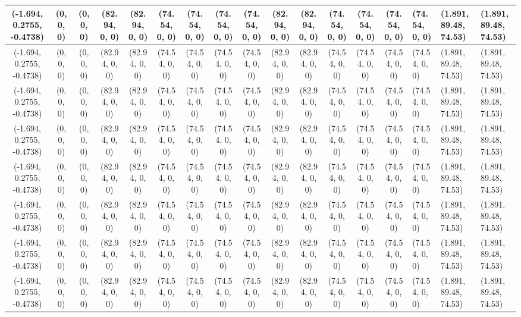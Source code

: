 \begin{tabular}{| c | c | c | c | c | c | c | c | c | c | c | c | c | c |}
	(-1.694, 0.2755, -0.4738) & (0, 0, 0) & (0, 0, 0) & (82.94, 0, 0) & (82.94, 0, 0) & (74.54, 0, 0) & (74.54, 0, 0) & (74.54, 0, 0) & (74.54, 0, 0) & (82.94, 0, 0) & (82.94, 0, 0) & (74.54, 0, 0) & (74.54, 0, 0) & (74.54, 0, 0) & (74.54, 0, 0) & (1.891, 89.48, 74.53) & (1.891, 89.48, 74.53) \\ \hline
	(-1.694, 0.2755, -0.4738) & (0, 0, 0) & (0, 0, 0) & (82.94, 0, 0) & (82.94, 0, 0) & (74.54, 0, 0) & (74.54, 0, 0) & (74.54, 0, 0) & (74.54, 0, 0) & (82.94, 0, 0) & (82.94, 0, 0) & (74.54, 0, 0) & (74.54, 0, 0) & (74.54, 0, 0) & (74.54, 0, 0) & (1.891, 89.48, 74.53) & (1.891, 89.48, 74.53) \\ \hline
	(-1.694, 0.2755, -0.4738) & (0, 0, 0) & (0, 0, 0) & (82.94, 0, 0) & (82.94, 0, 0) & (74.54, 0, 0) & (74.54, 0, 0) & (74.54, 0, 0) & (74.54, 0, 0) & (82.94, 0, 0) & (82.94, 0, 0) & (74.54, 0, 0) & (74.54, 0, 0) & (74.54, 0, 0) & (74.54, 0, 0) & (1.891, 89.48, 74.53) & (1.891, 89.48, 74.53) \\ \hline
	(-1.694, 0.2755, -0.4738) & (0, 0, 0) & (0, 0, 0) & (82.94, 0, 0) & (82.94, 0, 0) & (74.54, 0, 0) & (74.54, 0, 0) & (74.54, 0, 0) & (74.54, 0, 0) & (82.94, 0, 0) & (82.94, 0, 0) & (74.54, 0, 0) & (74.54, 0, 0) & (74.54, 0, 0) & (74.54, 0, 0) & (1.891, 89.48, 74.53) & (1.891, 89.48, 74.53) \\ \hline
	(-1.694, 0.2755, -0.4738) & (0, 0, 0) & (0, 0, 0) & (82.94, 0, 0) & (82.94, 0, 0) & (74.54, 0, 0) & (74.54, 0, 0) & (74.54, 0, 0) & (74.54, 0, 0) & (82.94, 0, 0) & (82.94, 0, 0) & (74.54, 0, 0) & (74.54, 0, 0) & (74.54, 0, 0) & (74.54, 0, 0) & (1.891, 89.48, 74.53) & (1.891, 89.48, 74.53) \\ \hline
	(-1.694, 0.2755, -0.4738) & (0, 0, 0) & (0, 0, 0) & (82.94, 0, 0) & (82.94, 0, 0) & (74.54, 0, 0) & (74.54, 0, 0) & (74.54, 0, 0) & (74.54, 0, 0) & (82.94, 0, 0) & (82.94, 0, 0) & (74.54, 0, 0) & (74.54, 0, 0) & (74.54, 0, 0) & (74.54, 0, 0) & (1.891, 89.48, 74.53) & (1.891, 89.48, 74.53) \\ \hline
	(-1.694, 0.2755, -0.4738) & (0, 0, 0) & (0, 0, 0) & (82.94, 0, 0) & (82.94, 0, 0) & (74.54, 0, 0) & (74.54, 0, 0) & (74.54, 0, 0) & (74.54, 0, 0) & (82.94, 0, 0) & (82.94, 0, 0) & (74.54, 0, 0) & (74.54, 0, 0) & (74.54, 0, 0) & (74.54, 0, 0) & (1.891, 89.48, 74.53) & (1.891, 89.48, 74.53) \\ \hline
	(-1.694, 0.2755, -0.4738) & (0, 0, 0) & (0, 0, 0) & (82.94, 0, 0) & (82.94, 0, 0) & (74.54, 0, 0) & (74.54, 0, 0) & (74.54, 0, 0) & (74.54, 0, 0) & (82.94, 0, 0) & (82.94, 0, 0) & (74.54, 0, 0) & (74.54, 0, 0) & (74.54, 0, 0) & (74.54, 0, 0) & (1.891, 89.48, 74.53) & (1.891, 89.48, 74.53) \\ \hline

\end{tabular}
